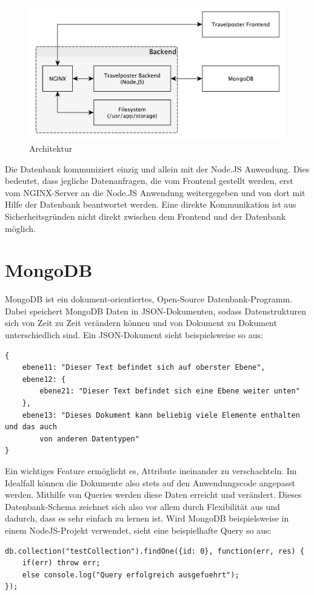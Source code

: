\documentclass[12pt,a4paper]{report}
\begin{document}
\begin{figure}[h]
	\centering
	\includegraphics[width=0.7\linewidth]{Bilder_Doku/architecture_overview}
	\caption[]{Architektur}
\end{figure}

Die Datenbank kommuniziert einzig und allein mit der Node.JS Anwendung. Dies bedeutet, dass jegliche Datenanfragen, die vom Frontend gestellt werden, erst vom NGINX-Server an die Node.JS Anwendung weitergegeben und von dort mit Hilfe der Datenbank beantwortet werden. Eine direkte Kommunikation ist aus Sicherheitsgründen nicht direkt zwischen dem Frontend und der Datenbank möglich.

\section{MongoDB}
MongoDB ist ein dokument-orientiertes, Open-Source Datenbank-Programm. Dabei speichert MongoDB Daten in JSON-Dokumenten, sodass Datenstrukturen sich von Zeit zu Zeit verändern können und von Dokument zu Dokument unterschiedlich sind. Ein JSON-Dokument sieht beispielsweise so aus:
\begin{verbatim}
{
    ebene11: "Dieser Text befindet sich auf oberster Ebene",
    ebene12: { 
        ebene21: "Dieser Text befindet sich eine Ebene weiter unten"
    },
    ebene13: "Dieses Dokument kann beliebig viele Elemente enthalten und das auch
        von anderen Datentypen"
}
\end{verbatim}

\noindent
Ein wichtiges Feature ermöglicht es, Attribute ineinander zu verschachteln. 
Im Idealfall können die Dokumente also stets auf den Anwendungscode angepasst werden. Mithilfe von Queries werden diese Daten erreicht und verändert. Dieses Datenbank-Schema zeichnet sich also vor allem durch Flexibilität aus und dadurch, dass es sehr einfach zu lernen ist. 
Wird MongoDB beispielsweise in einem NodeJS-Projekt verwendet, sieht eine beispielhafte Query so aus: 

\begin{verbatim}
db.collection("testCollection").findOne({id: 0}, function(err, res) {
    if(err) throw err;
    else console.log("Query erfolgreich ausgefuehrt");
});
\end{verbatim}
\end{document}
